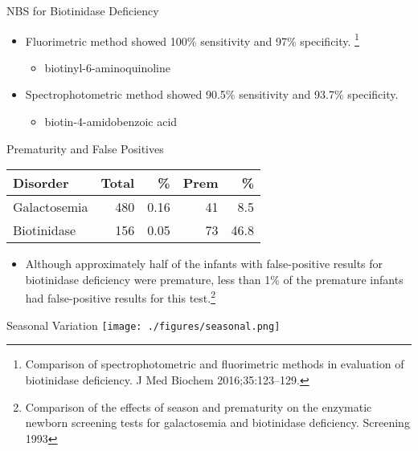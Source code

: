 \documentclass[presentation, smaller]{beamer}
\begin{document}
\begin{frame}[label={sec:orgheadline9}]{NBS for Biotinidase Deficiency}
\begin{itemize}
\item Fluorimetric method showed 100\% sensitivity and 97\% specificity. \footnote{Comparison of spectrophotometric and fluorimetric
methods in evaluation of biotinidase deficiency. J Med Biochem 2016;35:123–129.}
\begin{itemize}
\item biotinyl-6-aminoquinoline
\end{itemize}
\item Spectrophotometric method showed 90.5\% sensitivity and 93.7\% specificity.
\begin{itemize}
\item biotin-4-amidobenzoic acid
\end{itemize}
\end{itemize}
\end{frame}


\begin{frame}[label={sec:orgheadline10}]{Prematurity and False Positives}
\begin{center}
\begin{tabular}{lrrrr}
Disorder & Total & \% & Prem & \%\\
\hline
Galactosemia & 480 & 0.16 & 41 & 8.5\\
Biotinidase & 156 & 0.05 & 73 & 46.8\\
\end{tabular}
\end{center}

\begin{itemize}
\item Although approximately half of the infants with false-positive
results for biotinidase deficiency were premature, less than 1\% of
the premature infants had false-positive results for this test.\footnote{Comparison of the effects of season and prematurity on the
enzymatic newborn screening tests for galactosemia and biotinidase
deficiency. Screening 1993}
\end{itemize}
\end{frame}


\begin{frame}[label={sec:orgheadline11}]{Seasonal Variation}
\texttt{[image: ./figures/seasonal.png]}
\end{frame}
\end{document}
